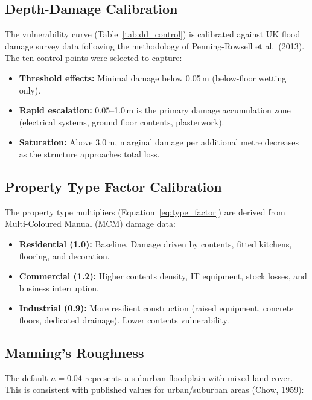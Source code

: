 \documentclass[11pt,a4paper]{article}
\begin{document}
\subsection{Depth-Damage Calibration}

The vulnerability curve (Table~\ref{tab:dd_control}) is calibrated against UK flood
damage survey data following the methodology of Penning-Rowsell et al.\ (2013). The
ten control points were selected to capture:

\begin{itemize}[nosep]
    \item \textbf{Threshold effects:} Minimal damage below 0.05\,m (below-floor wetting only).
    \item \textbf{Rapid escalation:} 0.05--1.0\,m is the primary damage accumulation zone
          (electrical systems, ground floor contents, plasterwork).
    \item \textbf{Saturation:} Above 3.0\,m, marginal damage per additional metre decreases
          as the structure approaches total loss.
\end{itemize}

\subsection{Property Type Factor Calibration}

The property type multipliers (Equation~\ref{eq:type_factor}) are derived from
Multi-Coloured Manual (MCM) damage data:

\begin{itemize}[nosep]
    \item \textbf{Residential (1.0):} Baseline. Damage driven by contents, fitted
          kitchens, flooring, and decoration.
    \item \textbf{Commercial (1.2):} Higher contents density, IT equipment, stock
          losses, and business interruption.
    \item \textbf{Industrial (0.9):} More resilient construction (raised equipment,
          concrete floors, dedicated drainage). Lower contents vulnerability.
\end{itemize}

\subsection{Manning's Roughness}

The default $n = 0.04$ represents a suburban floodplain with mixed land cover. This is
consistent with published values for urban/suburban areas (Chow, 1959):
\end{document}
